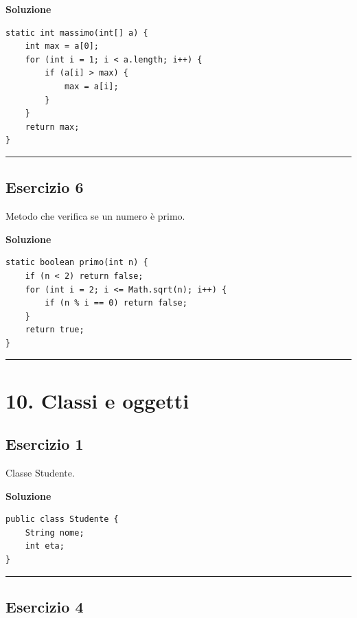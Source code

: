 \documentclass[
]{article}
\begin{document}
\textbf{Soluzione}

\begin{verbatim}
static int massimo(int[] a) {
    int max = a[0];
    for (int i = 1; i < a.length; i++) {
        if (a[i] > max) {
            max = a[i];
        }
    }
    return max;
}
\end{verbatim}

\begin{center}\rule{0.5\linewidth}{0.5pt}\end{center}

\subsection{Esercizio 6}\label{esercizio-6-4}

Metodo che verifica se un numero è primo.

\textbf{Soluzione}

\begin{verbatim}
static boolean primo(int n) {
    if (n < 2) return false;
    for (int i = 2; i <= Math.sqrt(n); i++) {
        if (n % i == 0) return false;
    }
    return true;
}
\end{verbatim}

\begin{center}\rule{0.5\linewidth}{0.5pt}\end{center}

\section{10. Classi e oggetti}\label{classi-e-oggetti}

\subsection{Esercizio 1}\label{esercizio-1-9}

Classe Studente.

\textbf{Soluzione}

\begin{verbatim}
public class Studente {
    String nome;
    int eta;
}
\end{verbatim}

\begin{center}\rule{0.5\linewidth}{0.5pt}\end{center}

\subsection{Esercizio 4}\label{esercizio-4-7}
\end{document}
